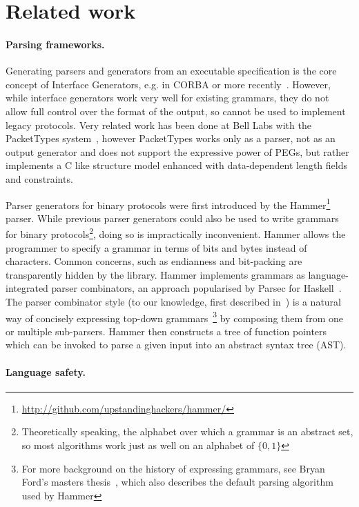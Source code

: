 \section{Related work}
\label{s:relwk}

\paragraph{Parsing frameworks.}

Generating parsers and generators from an executable specification
is the core concept of Interface Generators, e.g. in CORBA or more
recently~\cite{varda2008}. However, while interface generators work
very well for existing grammars, they do not allow full control over the
format of the output, so cannot be used to implement legacy protocols.
Very related work has been done at Bell Labs with the PacketTypes
system~\cite{mccann2000packet}, however PacketTypes works only as a
parser, not as an output generator and does not support the expressive
power of PEGs, but rather implements a C like structure model enhanced
with data-dependent length fields and constraints.

Parser generators for binary protocols were first introduced by the
Hammer\footnote{\url{http://github.com/upstandinghackers/hammer/}} parser.
While previous parser generators could also be used to write grammars
for binary protocols\footnote{Theoretically speaking, the alphabet
over which a grammar is an  abstract set, so most algorithms work
just as well on an alphabet of $\{0,1\}$}, doing so is impractically
inconvenient. Hammer allows the programmer to specify a grammar in
terms of bits and bytes instead of characters. Common concerns, such as
endianness and bit-packing are transparently hidden by the library. Hammer
implements grammars as language-integrated parser combinators, an approach
popularised by Parsec for Haskell~\cite{LeijenMeijer:parsec}. The
parser combinator style (to our knowledge, first  described
in~\cite{burge1975recursive}) is a natural way of concisely expressing
top-down grammars~\cite{Danielsson:2010:TPC:1863543.1863585}\footnote{For
more background on the history of expressing grammars, see Bryan Ford's
masters thesis~\cite{ford2002packrat}, which also describes the default
parsing algorithm used by Hammer} by composing them from one or multiple
sub-parsers.  Hammer then constructs a tree of function pointers which
can be invoked to parse a given input into an abstract syntax tree (AST).


\paragraph{Language safety.}

